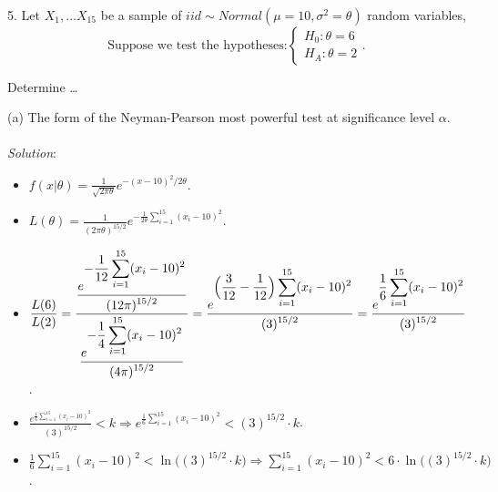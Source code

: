 \documentclass[12pt]{article}
\newcommand{\XB}{\color{black}}
\newcommand{\XBB}{\color{blue}}
\newcommand{\ds}{\displaystyle}
\begin{document}
\vspace{2.5mm}

\newpage
\XBB\hrulefill\XB \\

5. Let $ \ds X_{1}, \dots X_{15} $ be a sample of $ iid \sim Normal(\mu = 10, \sigma^{2} = \theta) $ random variables, \\

\[
    \text{Suppose we test the hypotheses:}
    \left\{ 
        \begin{array}{rl}
            H_{0} : \theta = 6 \\
            H_{A} : \theta = 2
        \end{array}.
    \right.
\]

Determine \dots \\

\XBB\hrulefill\XB 
\vspace{5mm} 

(a) The form of the Neyman-Pearson most powerful test at significance level $ \alpha $. \\
\vspace{2.5mm} \\
\textit{Solution}:
\vspace{2.5mm} \\

\begin{itemize} 
    \item $ \ds f(x | \theta) = \frac{1}{\ds \sqrt{2\pi\theta}}e^{\ds -(x-10)^{2}/2\theta} $.
    \item $ \ds L(\theta) = \frac{1}{\ds (2\pi\theta)^{15/2}}e^{\ds -\frac{1}{2\theta} \sum_{i=1}^{15} (x_{i}-10)^{2}} $.
    \item $ \ds \frac{L(6)}{L(2)} = \frac{ \ds \frac{ e^{\ds -\frac{1}{12} \sum_{i=1}^{15} (x_{i}-10)^{2}} }{\ds (12\pi)^{15/2}}}{ \ds \frac{e^{\ds -\frac{1}{4} \sum_{i=1}^{15} (x_{i}-10)^{2}}}{\ds (4\pi)^{15/2}} } = \frac{ e^{\ds \Bigl( \frac{3}{12} - \frac{1}{12} \Bigr) \sum_{i=1}^{15} (x_{i}-10)^{2}} }{\ds (3)^{15/2}} = \frac{ e^{\ds \frac{1}{6} \sum_{i=1}^{15} (x_{i}-10)^{2}} }{\ds (3)^{15/2}} $.
    \item $ \ds \frac{ e^{\ds \frac{1}{6} \sum_{i=1}^{15} (x_{i}-10)^{2}} }{\ds (3)^{15/2}} < k \Rightarrow e^{\ds \frac{1}{6} \sum_{i=1}^{15} (x_{i}-10)^{2}} < (3)^{15/2} \cdot k $.
    \item $ \ds \frac{1}{6} \sum_{i=1}^{15} (x_{i}-10)^{2} < \ln \bigl( (3)^{15/2} \cdot k \bigr) \Rightarrow \sum_{i=1}^{15} (x_{i}-10)^{2} < 6 \cdot \ln \bigl( (3)^{15/2} \cdot k \bigr) $.
\end{itemize}
\end{document}
